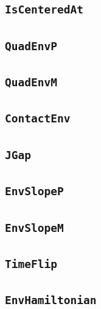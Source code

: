 \documentclass[11pt]{amsart}
\theoremstyle{definition}
\begin{document}
\subsection{\texorpdfstring{\texttt{IsCenteredAt}}{IsCenteredAt}}\label{node:IsCenteredAt}


\subsection{\texorpdfstring{\texttt{QuadEnvP}}{QuadEnvP}}\label{node:QuadEnvP}


\subsection{\texorpdfstring{\texttt{QuadEnvM}}{QuadEnvM}}\label{node:QuadEnvM}


\subsection{\texorpdfstring{\texttt{ContactEnv}}{ContactEnv}}\label{node:ContactEnv}


\subsection{\texorpdfstring{\texttt{JGap}}{JGap}}\label{node:JGap}


\subsection{\texorpdfstring{\texttt{EnvSlopeP}}{EnvSlopeP}}\label{node:EnvSlopeP}


\subsection{\texorpdfstring{\texttt{EnvSlopeM}}{EnvSlopeM}}\label{node:EnvSlopeM}


\subsection{\texorpdfstring{\texttt{TimeFlip}}{TimeFlip}}\label{node:TimeFlip}


\subsection{\texorpdfstring{\texttt{EnvHamiltonian}}{EnvHamiltonian}}\label{node:EnvHamiltonian}

\end{document}
